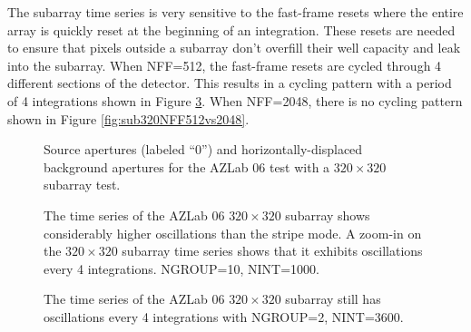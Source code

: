 \documentclass{aastex62}
\begin{document}
The subarray time series is very sensitive to the fast-frame resets where the entire array is quickly reset at the beginning of an integration.
These resets are needed to ensure that pixels outside a subarray don't overfill their well capacity and leak into the subarray.
When NFF=512, the fast-frame resets are cycled through 4 different sections of the detector.
This results in a cycling pattern with a period of 4 integrations shown in Figure \ref{fig:sub320vsStripeBaseline2}.
When NFF=2048, there is no cycling pattern shown in Figure \ref{fig:sub320NFF512vs2048}.

\begin{figure}
\caption{Source apertures (labeled ``0'') and horizontally-displaced background apertures for the AZLab 06 test with a $320 \times 320$ subarray test.}\label{fig:sub320AperturesAZlab06}
\end{figure}


\begin{figure}
\caption{The time series of the AZLab 06 $320 \times 320$ subarray shows considerably higher oscillations than the stripe mode.
A zoom-in on the $320 \times 320$ subarray time series shows that it exhibits oscillations every 4 integrations.
NGROUP=10, NINT=1000.
}\label{fig:sub320vsStripeBaseline2}
\end{figure}

\begin{figure}
\caption{The time series of the AZLab 06 $320 \times 320$ subarray still has oscillations every 4 integrations with NGROUP=2, NINT=3600.
}\label{fig:sub320vsStripeBaseline2}
\end{figure}
\end{document}

